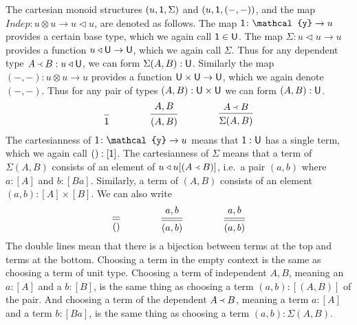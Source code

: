 \documentclass[11pt, one side, article]{memoir}
\theoremstyle{definition}
\theoremstyle{plain}
\newcommand{\Fun}[1]{\mathit{#1}}%
\newcommand{\tn}[1]{\textnormal{#1}}
\newcommand{\yon}{\mathcal{y}}
\newcommand{\0}{\textsf{0}}
\newcommand{\1}{\tn{\textsf{1}}}
\newcommand{\U}{\tn{\textsf{U}}}
\newcommand{\tri}{\mathbin{\triangleleft}}
\newcommand{\indep}{\Fun{Indep}}
\newcommand{\founds}{\Yleft}
\begin{document}
The cartesian monoid structures $(u,\1,\Sigma)$ and $(u,\1,(-,-))$, and the map $\indep\colon u\otimes u\to u\tri u$, are denoted as follows. The map $\1\colon\yon\to u$ provides a certain base type, which we again call $\1\in \U$. The map $\Sigma\colon u\tri u\to u$ provides a function $u\tri\U\to\U$, which we again call $\Sigma$. Thus for any dependent type $A\founds B:u\tri\U$, we can form $\Sigma(A,B):\U$. Similarly the map $(-,-)\colon u\otimes u\to u$ provides a function $\U\times \U\to\U$, which we again denote $(-,-)$. Thus for any pair of types $(A,B):\U\times \U$ we can form $(A,B):\U$. 
\[
  \begin{prooftree}
  	\Hypo{\vphantom{L}}
    \Infer1{\1}
  \end{prooftree}
  \hspace{.6in} 
  \begin{prooftree}
    \Hypo{A, B}
    \Infer1{(A,B)}
  \end{prooftree}
\hspace{.6in}
  \begin{prooftree}
    \Hypo{A\founds B}
    \Infer1{\Sigma(A,B)}
  \end{prooftree}
\]
The cartesianness of $\1\colon\yon\to u$ means that $\1:\U$ has a single term, which we again call $():[\1]$. The cartesianness of $\Sigma$ means that a term of $\Sigma(A,B)$ consists of an element of $u\tri u[(A\founds B)]$, i.e.\ a pair $(a,b)$ where $a:[A]$ and $b:[Ba]$. Similarly, a term of $(A,B)$ consists of an element $(a,b):[A]\times[B]$. We can also write
\begin{equation}\label{eqn.dep_vs_sigma}
\begin{prooftree}
  \Hypo{\vphantom{L}}
  \Infer[double]1{()}
\end{prooftree}
\hspace{.6in}
\begin{prooftree}
  \Hypo{a,b}
  \Infer[double]1{(a,b)}
\end{prooftree}
\hspace{.6in}
\begin{prooftree}
  \Hypo{a,b}
  \Infer[double]1{(a,b)}
\end{prooftree}
\end{equation}
The double lines mean that there is a bijection between terms at the top and terms at the bottom. Choosing a term in the empty context is the same as choosing a term of unit type. Choosing a term of independent $A,B$, meaning an $a:[A]$ and a $b:[B]$, is the same thing as choosing a term $(a,b):[(A,B)]$ of the pair. And choosing a term of the dependent $A\founds B$, meaning a term $a:[A]$ and a term $b:[B a]$, is the same thing as choosing a term $(a,b):\Sigma(A,B)$. 
\end{document}
